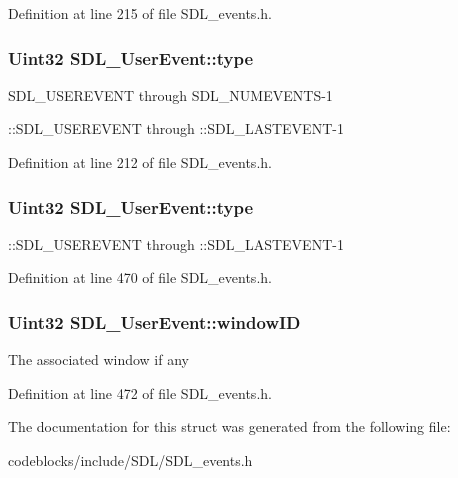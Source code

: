 Definition at line 215 of file S\+D\+L\+\_\+events.\+h.

\hypertarget{structSDL__UserEvent_ab7afa8b98dbd7b52bef41155e10f7340}{
\subsubsection[{type}]{\setlength{\rightskip}{0pt plus 5cm}Uint32 S\+D\+L\+\_\+\+User\+Event\+::type}}\label{structSDL__UserEvent_ab7afa8b98dbd7b52bef41155e10f7340}
S\+D\+L\+\_\+\+U\+S\+E\+R\+E\+V\+E\+N\+T through S\+D\+L\+\_\+\+N\+U\+M\+E\+V\+E\+N\+T\+S-\/1

\+::\+S\+D\+L\+\_\+\+U\+S\+E\+R\+E\+V\+E\+N\+T through \+::\+S\+D\+L\+\_\+\+L\+A\+S\+T\+E\+V\+E\+N\+T-\/1 

Definition at line 212 of file S\+D\+L\+\_\+events.\+h.

\hypertarget{structSDL__UserEvent_ab7afa8b98dbd7b52bef41155e10f7340}{
\subsubsection[{type}]{\setlength{\rightskip}{0pt plus 5cm}Uint32 S\+D\+L\+\_\+\+User\+Event\+::type}}\label{structSDL__UserEvent_ab7afa8b98dbd7b52bef41155e10f7340}
\+::\+S\+D\+L\+\_\+\+U\+S\+E\+R\+E\+V\+E\+N\+T through \+::\+S\+D\+L\+\_\+\+L\+A\+S\+T\+E\+V\+E\+N\+T-\/1 

Definition at line 470 of file S\+D\+L\+\_\+events.\+h.

\hypertarget{structSDL__UserEvent_abccefa10e0e0e3a0801bc6d836a08da7}{
\subsubsection[{window\+I\+D}]{\setlength{\rightskip}{0pt plus 5cm}Uint32 S\+D\+L\+\_\+\+User\+Event\+::window\+I\+D}}\label{structSDL__UserEvent_abccefa10e0e0e3a0801bc6d836a08da7}
The associated window if any 

Definition at line 472 of file S\+D\+L\+\_\+events.\+h.



The documentation for this struct was generated from the following file\+:\begin{DoxyCompactItemize}
\item 
codeblocks/include/\+S\+D\+L/S\+D\+L\+\_\+events.\+h\end{DoxyCompactItemize}
